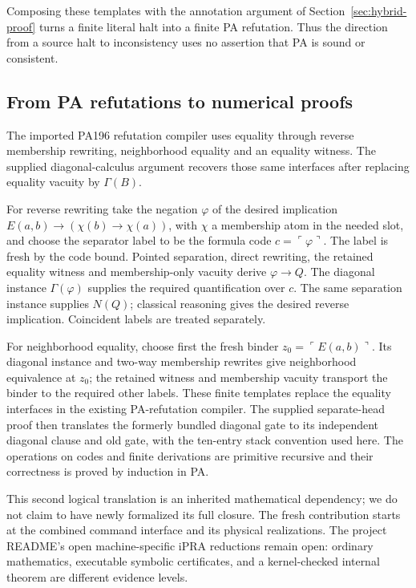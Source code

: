 \documentclass[11pt,letterpaper]{article}
\begin{document}
Composing these templates with the annotation argument of
Section~\ref{sec:hybrid-proof} turns a finite literal halt into a finite
PA refutation. Thus the direction from a source halt to inconsistency
uses no assertion that PA is sound or consistent.

\subsection{From PA refutations to numerical proofs}

The imported PA196 refutation compiler uses equality through reverse
membership rewriting, neighborhood equality and an equality witness.
The supplied diagonal-calculus argument recovers those same interfaces
after replacing equality vacuity by $\Gamma(B)$.

For reverse rewriting take the negation $\varphi$ of the desired
implication $E(a,b)\to(\chi(b)\to\chi(a))$, with $\chi$ a membership
atom in the needed slot, and choose the separator label to be the formula
code $c=\ulcorner\varphi\urcorner$. The label is fresh by the code bound.
Pointed separation, direct rewriting, the retained equality witness and
membership-only vacuity derive $\varphi\to Q$. The diagonal instance
$\Gamma(\varphi)$ supplies the required quantification over $c$.
The same separation instance supplies $N(Q)$; classical reasoning gives
the desired reverse implication. Coincident labels are treated separately.

For neighborhood equality, choose first the fresh binder
$z_0=\ulcorner E(a,b)\urcorner$. Its diagonal instance and two-way
membership rewrites give neighborhood equivalence at $z_0$; the retained
witness and membership vacuity transport the binder to the required
other labels. These finite templates replace the equality interfaces in
the existing PA-refutation compiler. The supplied separate-head proof
then translates the formerly bundled diagonal gate to its independent
diagonal clause and old gate, with the ten-entry stack convention used
here. The operations on codes and finite derivations are primitive
recursive and their correctness is proved by induction in PA.

This second logical translation is an inherited mathematical dependency;
we do not claim to have newly formalized its full closure. The fresh
contribution starts at the combined command interface and its physical
realizations. The project README's open machine-specific iPRA reductions
remain open: ordinary mathematics, executable symbolic certificates, and
a kernel-checked internal theorem are different evidence levels.
\end{document}
